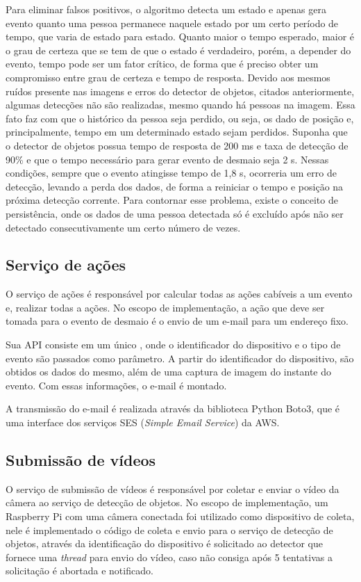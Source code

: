 \documentclass[]{politex}
\begin{document}
Para eliminar falsos positivos, o algoritmo detecta um estado e apenas gera evento quanto uma pessoa permanece naquele estado por um certo período de tempo, que varia de estado para estado. Quanto maior o tempo esperado, maior é o grau de certeza que se tem de que o estado é verdadeiro, porém, a depender do evento, tempo pode ser um fator crítico, de forma que é preciso obter um compromisso entre grau de certeza e tempo de resposta. Devido aos mesmos ruídos presente nas imagens e erros do detector de objetos, citados anteriormente, algumas detecções não são realizadas, mesmo quando há pessoas na imagem. Essa fato faz com que o histórico da pessoa seja perdido, ou seja, os dado de posição e, principalmente, tempo em um determinado estado sejam perdidos. Suponha que o detector de objetos possua tempo de resposta de 200 ms e taxa de detecção de 90\% e que o tempo necessário para gerar evento de desmaio seja 2 s. Nessas condições, sempre que o evento atingisse tempo de 1,8 s, ocorreria um erro de detecção, levando a perda dos dados, de forma a reiniciar o tempo e posição na próxima detecção corrente. Para contornar esse problema, existe o conceito de persistência, onde os dados de uma pessoa detectada só é excluído após não ser detectado consecutivamente um certo número de vezes.

\subsection{Serviço de ações}
O serviço de ações é responsável por calcular todas as ações cabíveis a um evento e, realizar todas a ações. No escopo de implementação, a ação que deve ser tomada para o evento de desmaio é o envio de um e-mail para um endereço fixo.

Sua API consiste em um único , onde o identificador do dispositivo e o tipo de evento são passados como parâmetro. A partir do identificador do dispositivo, são obtidos os dados do mesmo, além de uma captura de imagem do instante do evento. Com essas informações, o e-mail é montado.

A transmissão do e-mail é realizada através da biblioteca Python Boto3, que é uma interface dos serviços SES (\textit{Simple Email Service}) da AWS.

\subsection{Submissão de vídeos}
O serviço de submissão de vídeos é responsável por coletar e enviar o vídeo da câmera ao serviço de detecção de objetos. No escopo de implementação, um Raspberry Pi com uma câmera conectada foi utilizado como dispositivo de coleta, nele é implementado o código de coleta e envio para o serviço de detecção de objetos, através da identificação do dispositivo é solicitado ao detector que fornece uma \textit{thread} para envio do vídeo, caso não consiga após 5 tentativas a solicitação é abortada e notificado.
\end{document}
